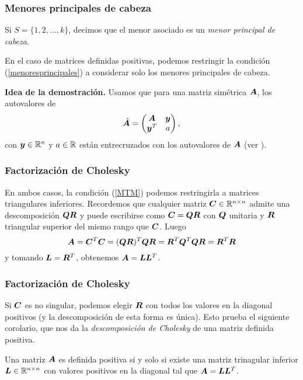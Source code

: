 \documentclass[aspectratio=169,12pt,spanish]{beamer}
\begin{document}

\begin{frame}
\frametitle{Menores principales de cabeza}

Si $S = \{1, 2, \dots, k\}$, decimos que el menor asociado es un \emph{menor principal de cabeza}.

En el caso de matrices definidas positivas, podemos restringir la condición (\ref{menoresprincipales}) a considerar solo los menores principales de cabeza.

\textbf{Idea de la demostración.} Usamos que para una matriz simétrica $\bm{A}$, los autovalores de
$$
\hat {\bm{A}} = \begin{pmatrix}
\bm{A} & \bm{y} \\
\bm{y}^T & a
\end{pmatrix},$$
con $\bm{y} \in \mathbb{R}^n$ y $a \in \mathbb{R}$ están entrecruzados con los autovalores de $\bm{A}$ (ver \cite[Teorema 4.3.8]{Horn1985}).


\end{frame}


\begin{frame}
\frametitle{Factorización de Cholesky}

En ambos casos, la condición (\ref{MTM}) podemos restringirla a matrices triangulares inferiores. Recordemos que cualquier matriz $\bm{C} \in \mathbb{R}^{n\times n}$ admite una descomposición $\bm{Q}\bm{R}$ y puede escribirse como $\bm{C} = \bm{Q} \bm{R}$ con $\bm{Q}$ unitaria y $\bm{R}$ triangular superior del mismo rango que $\bm{C}$. Luego
$$
\bm{A} = \bm{C}^T \bm{C} = (\bm{Q} \bm{R})^T \bm{Q} \bm{R} = \bm{R}^T \bm{Q}^T \bm{Q} \bm{R} = \bm{R}^T \bm{R}
$$
y tomando $\bm{L} = \bm{R}^T$, obtenemos $\bm{A} = \bm{L} \bm{L}^T$.

\end{frame}


\begin{frame}
\frametitle{Factorización de Cholesky}


Si $\bm{C}$ es no singular, podemos elegir $\bm{R}$ con todos los valores en la diagonal positivos (y la descomposición de esta forma es única).
Esto prueba el siguiente corolario, que nos da la \emph{descomposición de Cholesky} de una matriz definida positiva.

\begin{corollary}
Una matriz $\bm{A}$ es definida positiva si y solo si existe una matriz trinagular inferior $\bm{L} \in \mathbb{R}^{n\times n}$ con valores positivos en la diagonal tal que $\bm{A} = \bm{L} \bm{L}^T$.
\end{corollary}



\end{frame}
\end{document}
